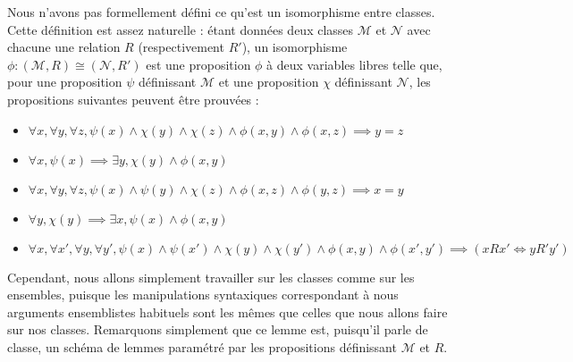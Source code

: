 \begin{remark}
  Nous n'avons pas formellement défini ce qu'est un isomorphisme entre classes.
  Cette définition est assez naturelle : étant données deux classes $\mathcal M$
  et $\mathcal N$ avec chacune une relation $R$ (respectivement $R'$), un
  isomorphisme $\phi : (\mathcal M,R)\cong (\mathcal N,R')$ est une proposition
  $\phi$ à deux variables libres telle que, pour une proposition $\psi$
  définissant $\mathcal M$ et une proposition $\chi$ définissant $\mathcal N$,
  les propositions suivantes peuvent être prouvées :
  \begin{itemize}
  \item $\forall x,\forall y,\forall z, \psi(x)\land \chi(y)\land\chi(z)\land
    \phi(x,y)\land\phi(x,z) \implies y = z$
  \item $\forall x,\psi(x)\implies \exists y, \chi(y)\land \phi(x,y)$
  \item $\forall x,\forall y,\forall z, \psi(x)\land\psi(y)\land\chi(z)\land
    \phi(x,z)\land\phi(y,z)\implies x = y$
  \item $\forall y,\chi(y)\implies \exists x, \psi(x)\land \phi(x,y)$
  \item $\forall x,\forall x',\forall y, \forall y', \psi(x)\land\psi(x')\land
    \chi(y)\land\chi(y')\land\phi(x,y)\land\phi(x',y')\implies
    (xR x'\iff yR' y')$
  \end{itemize}

  Cependant, nous allons simplement travailler sur les classes comme sur les
  ensembles, puisque les manipulations syntaxiques correspondant à nous
  arguments ensemblistes habituels sont les mêmes que celles que nous allons
  faire sur nos classes. Remarquons simplement que ce lemme est, puisqu'il parle
  de classe, un schéma de lemmes paramétré par les propositions définissant
  $\mathcal M$ et $R$.
\end{remark}

